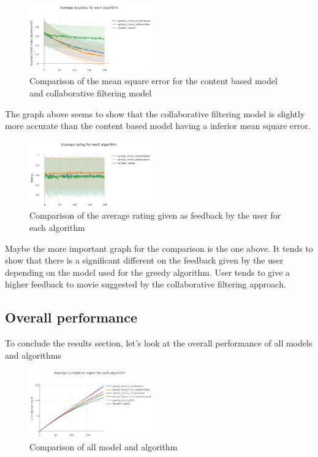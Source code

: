 \documentclass[letterpaper]{article}
\begin{document}
\begin{figure}[H]
\begin{center}
\includegraphics[width=0.47\textwidth]{img/collabo2.png}
\caption{Comparison of the mean square error for the content based model and collaborative filtering model}
\label{collabo2}
\end{center}
\end{figure}

The graph above seems to show that the collaborative filtering model is slightly more accurate than the content based model having a inferior mean square error.

\begin{figure}[H]
\begin{center}
\includegraphics[width=0.47\textwidth]{img/collabo3.png}
\caption{Comparison of the average rating given as feedback by the user for each algorithm}
\label{collabo3}
\end{center}
\end{figure}

Maybe the more important graph for the comparison is the one above. It tends to show that there is a significant different on the feedback given by the user depending on the model used for the greedy algorithm. User tends to give a higher feedback to movie suggested by the collaborative filtering approach.

\subsection{Overall performance}

To conclude the results section, let's look at the overall performance of all models and algorithms 

\begin{figure}[H]
\begin{center}
\includegraphics[width=0.47\textwidth]{img/greedy_all0.png}
\caption{Comparison of all model and algorithm}
\label{overallperf}
\end{center}
\end{figure}
\end{document}
